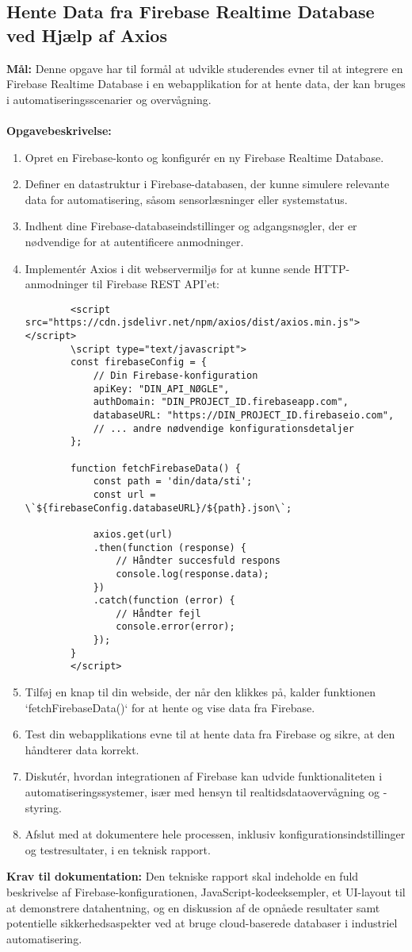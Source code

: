 \subsection*{Hente Data fra Firebase Realtime Database ved Hjælp af Axios}
\label{subsec:firebase_data_fetch_axios}

\textbf{Mål:} Denne opgave har til formål at udvikle studerendes evner til at integrere en Firebase Realtime Database i en webapplikation for at hente data, der kan bruges i automatiseringsscenarier og overvågning.
\\\\
\noindent\textbf{Opgavebeskrivelse:}
\begin{enumerate}
	\item Opret en Firebase-konto og konfigurér en ny Firebase Realtime Database.
	\item Definer en datastruktur i Firebase-databasen, der kunne simulere relevante data for automatisering, såsom sensorlæsninger eller systemstatus.
	\item Indhent dine Firebase-databaseindstillinger og adgangsnøgler, der er nødvendige for at autentificere anmodninger.
	\item Implementér Axios i dit webservermiljø for at kunne sende HTTP-anmodninger til Firebase REST API'et:
	\begin{verbatim}
		<script src="https://cdn.jsdelivr.net/npm/axios/dist/axios.min.js"></script>
		\script type="text/javascript">
		const firebaseConfig = {
			// Din Firebase-konfiguration
			apiKey: "DIN_API_NØGLE",
			authDomain: "DIN_PROJECT_ID.firebaseapp.com",
			databaseURL: "https://DIN_PROJECT_ID.firebaseio.com",
			// ... andre nødvendige konfigurationsdetaljer
		};
		
		function fetchFirebaseData() {
			const path = 'din/data/sti';
			const url = \`${firebaseConfig.databaseURL}/${path}.json\`;
			
			axios.get(url)
			.then(function (response) {
				// Håndter succesfuld respons
				console.log(response.data);
			})
			.catch(function (error) {
				// Håndter fejl
				console.error(error);
			});
		}
		</script>
	\end{verbatim}
	\item Tilføj en knap til din webside, der når den klikkes på, kalder funktionen `fetchFirebaseData()` for at hente og vise data fra Firebase.
	\item Test din webapplikations evne til at hente data fra Firebase og sikre, at den håndterer data korrekt.
	\item Diskutér, hvordan integrationen af Firebase kan udvide funktionaliteten i automatiseringssystemer, især med hensyn til realtidsdataovervågning og -styring.
	\item Afslut med at dokumentere hele processen, inklusiv konfigurationsindstillinger og testresultater, i en teknisk rapport.
\end{enumerate}
\textbf{Krav til dokumentation:} Den tekniske rapport skal indeholde en fuld beskrivelse af Firebase-konfigurationen, JavaScript-kodeeksempler, et UI-layout til at demonstrere datahentning, og en diskussion af de opnåede resultater samt potentielle sikkerhedsaspekter ved at bruge cloud-baserede databaser i industriel automatisering.

